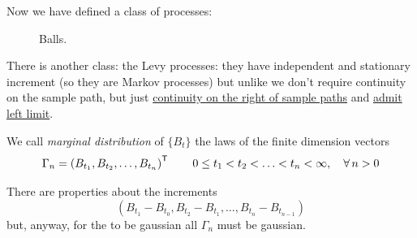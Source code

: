 \documentclass[12pt]{report}
\begin{document}
Now we have defined a class of processes:
\begin{figure}[H]
	\centering
	\caption{Balls.}
\end{figure}
There is another class: the Levy processes: they have independent and stationary increment (so they are Markov processes) but unlike \bwm{} we don't require continuity on the sample path, but just \ul{continuity on the right of sample paths} and \ul{admit left limit}.
\begin{definition}
	We call \emph{marginal distribution} of $\{B_{t}\}$ the laws of the finite dimension vectors
	\begin{equation*}
		\Gamma_{n}=\left(B_{t_{1}},B_{t_{2}},\ldots,B_{t_{n}}\right)^{\mathsf{T}}\qquad 0\leq t_{1}<t_{2}<\ldots<t_{n}<\infty,\quad\forall\, n>0
	\end{equation*}
\end{definition}
There are properties about the increments
\begin{equation*}
	(B_{t_{1}}-B_{t_{0}},B_{t_{2}}-B_{t_{1}},\ldots,B_{t_{n}}-B_{t_{n-1}})
\end{equation*}
but, anyway, for the \bwm{} to be gaussian all $\Gamma_{n}$ must be gaussian. 
\end{document}
